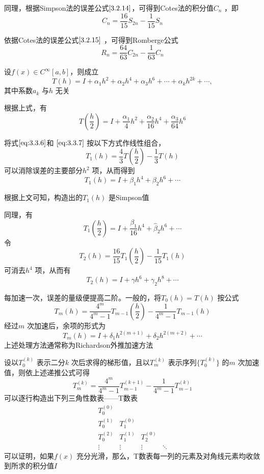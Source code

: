 \documentclass[a4paper]{article}
\begin{document}
同理，根据Simpson法的误差公式$\ref{3.2.14}$，可得到Cotes法的积分值$C_n$ ，即
\[
	C_n = \frac{16}{15} S_{2n} - \frac{1}{15} S_n \tag{3.3.4} \label{eq:3.3.4}
\] 

依据Cotes法的误差公式$\ref{3.2.15}$ ，可得到Romberge公式
\[
	R_n = \frac{64}{63} C_{2n} - \frac{1}{63} C_n \tag{3.3.5} \label{eq:3.3.5}
\] 
\begin{theorem}
	设$f(x) \in C^{\infty}[a,b]$，则成立
	\[
		T(h) = I + \alpha_1 h^2 + \alpha_2 h^{4} + \alpha_3 h^{6} + \cdots + \alpha_k h^{2k} + \cdots, \tag{3.3.6} \label{eq:3.3.6}
	\] 
	其中系数$a_k$ 与$h$ 无关
\end{theorem}
根据上式，有
\[
	T(\frac{h}{2}) = I + \frac{\alpha_1}{4} h^2 + \frac{\alpha_2}{16} h^{4} + \frac{\alpha_3}{64} h^{6} \tag{3.3.7} \label{eq:3.3.7}
\] 

将式$\ref{eq:3.3.6}$和 $\ref{eq:3.3.7}$ 按以下方式作线性组合，
\[
	T_1(h) = \frac{4}{3} T(\frac{h}{2}) - \frac{1}{3} T(h) \tag{3.3.8} \label{eq:3.3.8}
\] 
可以消除误差的主要部分$h^2$ 项，从而得到
\[
	T_1(h) = I + \beta_1 h^{4} + \beta_2 h^{6} + \cdots \tag{3.3.9} \label{eq:3.3.9}
\] 

根据上文可知，构造出的$T_1(h)$ 是Simpson值

同理，有
\[
T_1(\frac{h}{2}) = I + \frac{\beta_1}{16} h^{4} + \hat{\beta}_2 h^{6} + \cdots
\] 
令
\[
T_2(h) = \frac{16}{15} T_1(\frac{h}{2}) - \frac{1}{15}T_1(h)
\] 
可消去$h^{4}$ 项，从而有
\[
T_2(h) = I + \gamma h^{6} + \gamma_2 h^{8} + \cdots
\] 

每加速一次，误差的量级便提高二阶。一般的，将$T_0(h) = T(h)$ 按公式
\[
	T_m(h) = \frac{4^{m}}{4^{m}-1} T_{m-1}(\frac{h}{2}) - \frac{1}{4^{m}-1}T_{m-1}(h) \tag{3.3.10} \label{eq:3.3.10}
\] 
经过$m$ 次加速后，余项的形式为
\[
	T_m(h) = I + \delta_1 h^{2(m+1)} + \delta_2 h^{2(m+2)} + \cdots \tag{3.3.11} \label{eq:3.3.11}
\] 
上述处理方法通常称为Richardson外推加速方法

设以$T_0^{(k)}$ 表示二分$k$ 次后求得的梯形值，且以$T_m^{(k)}$ 表示序列$\{T_0^{(k)}\} $ 的$m$ 次加速值，则依上述递推公式可得
\[
	T_m^{(k)} = \frac{4^{m}}{4^{m} - 1} T_{m-1}^{(k+1)} - \frac{1}{4^{m}-1} T_{m-1}^{(k)} \tag{3.3.12} \label{eq:3.3.12}
\] 
可以逐行构造出下列三角性数表——T数表
\[
\begin{matrix} 
T_0^{(0)} \\
T_0^{(1)} & T_1^{(0)} \\
T_0^{(2)} & T_1^{(1)} & T_2^{(0)} \\
\vdots & \vdots & \vdots & \ddots
\end{matrix} 
\] 
可以证明，如果$f(x)$ 充分光滑，那么，T数表每一列的元素及对角线元素均收敛到所求的积分值$I$ 
\end{document}
